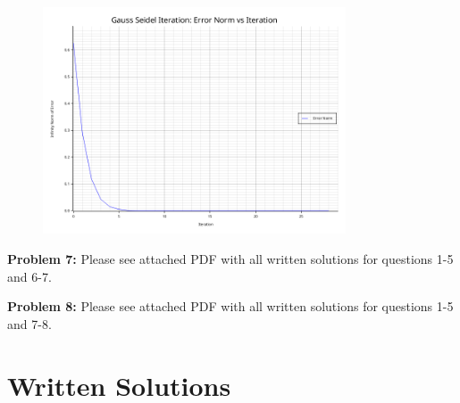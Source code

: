 \documentclass[12pt, letterpaper]{article}
\theoremstyle{nonumberplain}
\begin{document}
\begin{figure}[!htbp]
	\centering
	\includegraphics[width=0.8\textwidth]{gauss_seidel_error_plot.png}
\end{figure}

\clearpage

\hspace{18pt}\textbf{Problem 7:} \medskip
Please see attached PDF with all written solutions for questions 1-5 and 6-7.

\hspace{18pt}\textbf{Problem 8:} \medskip
Please see attached PDF with all written solutions for questions 1-5 and 7-8.

\clearpage

\section{Written Solutions}

\end{document}
